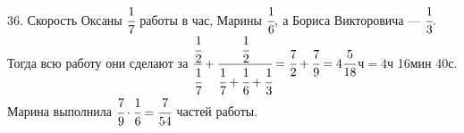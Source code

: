 36. Скорость Оксаны $\cfrac{1}{7}$ работы в час, Марины $\cfrac{1}{6},$ а Бориса Викторовича --- $\cfrac{1}{3}.$ Тогда всю работу они сделают за $\cfrac{\cfrac{1}{2}}{\cfrac{1}{7}}+\cfrac{\cfrac{1}{2}}{\cfrac{1}{7}+\cfrac{1}{6}+\cfrac{1}{3}}=\cfrac{7}{2}+\cfrac{7}{9}=4\cfrac{5}{18}$ч$=4$ч 16мин 40с. Марина выполнила $\cfrac{7}{9}\cdot\cfrac{1}{6}=\cfrac{7}{54}$ частей работы.\\
